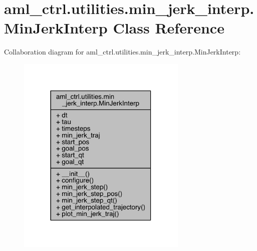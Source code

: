 \hypertarget{classaml__ctrl_1_1utilities_1_1min__jerk__interp_1_1_min_jerk_interp}{}\section{aml\+\_\+ctrl.\+utilities.\+min\+\_\+jerk\+\_\+interp.\+Min\+Jerk\+Interp Class Reference}
\label{classaml__ctrl_1_1utilities_1_1min__jerk__interp_1_1_min_jerk_interp}


Collaboration diagram for aml\+\_\+ctrl.\+utilities.\+min\+\_\+jerk\+\_\+interp.\+Min\+Jerk\+Interp\+:
\nopagebreak
\begin{figure}[H]
\begin{center}
\leavevmode
\includegraphics[width=230pt]{classaml__ctrl_1_1utilities_1_1min__jerk__interp_1_1_min_jerk_interp__coll__graph}
\end{center}
\end{figure}
